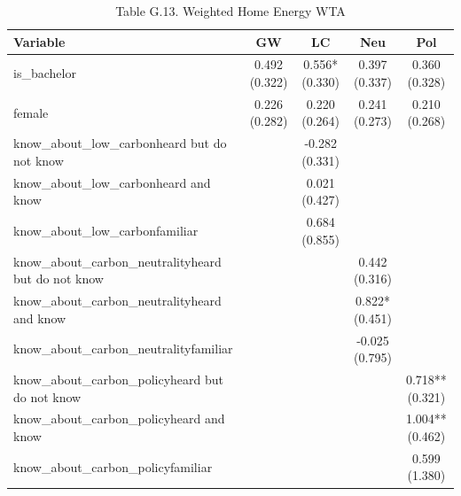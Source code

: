\begin{table}[!htbp]
\centering
\caption{Table G.13. Weighted Home Energy WTA}
\begin{tabular}{lcccc}
\hline
Variable & GW & LC & Neu & Pol \\
\hline
is\_bachelor & 0.492 (0.322) & 0.556* (0.330) & 0.397 (0.337) & 0.360 (0.328) \\
female & 0.226 (0.282) & 0.220 (0.264) & 0.241 (0.273) & 0.210 (0.268) \\
know\_about\_low\_carbonheard but do not know &  & -0.282 (0.331) &  &  \\
know\_about\_low\_carbonheard and know &  & 0.021 (0.427) &  &  \\
know\_about\_low\_carbonfamiliar &  & 0.684 (0.855) &  &  \\
know\_about\_carbon\_neutralityheard but do not know &  &  & 0.442 (0.316) &  \\
know\_about\_carbon\_neutralityheard and know &  &  & 0.822* (0.451) &  \\
know\_about\_carbon\_neutralityfamiliar &  &  & -0.025 (0.795) &  \\
know\_about\_carbon\_policyheard but do not know &  &  &  & 0.718** (0.321) \\
know\_about\_carbon\_policyheard and know &  &  &  & 1.004** (0.462) \\
know\_about\_carbon\_policyfamiliar &  &  &  & 0.599 (1.380) \\
\hline
\end{tabular}
\end{table}
